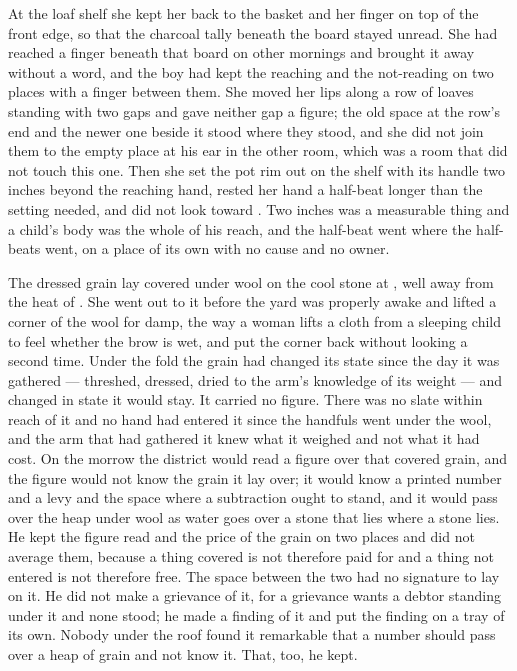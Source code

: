 At the loaf shelf she kept her back to the basket and her finger on top of the front edge, so that the charcoal tally beneath the board stayed unread. She had reached a finger beneath that board on other mornings and brought it away without a word, and the boy had kept the reaching and the not-reading on two places with a finger between them. She moved her lips along a row of loaves standing with two gaps and gave neither gap a figure; the old space at the row's end and the newer one beside it stood where they stood, and she did not join them to the empty place at his ear in the other room, which was a room that did not touch this one. Then she set the pot rim out on the shelf with its handle two inches beyond the reaching hand, rested her hand a half-beat longer than the setting needed, and did not look toward . Two inches was a measurable thing and a child's body was the whole of his reach, and the half-beat went where the half-beats went, on a place of its own with no cause and no owner.

\scenebreak

The dressed grain lay covered under wool on the cool stone at , well away from the heat of . She went out to it before the yard was properly awake and lifted a corner of the wool for damp, the way a woman lifts a cloth from a sleeping child to feel whether the brow is wet, and put the corner back without looking a second time. Under the fold the grain had changed its state since the day it was gathered --- threshed, dressed, dried to the arm's knowledge of its weight --- and changed in state it would stay. It carried no figure. There was no slate within reach of it and no hand had entered it since the handfuls went under the wool, and the arm that had gathered it knew what it weighed and not what it had cost. On the morrow the district would read a figure over that covered grain, and the figure would not know the grain it lay over; it would know a printed number and a levy and the space where a subtraction ought to stand, and it would pass over the heap under wool as water goes over a stone that lies where a stone lies. He kept the figure read and the price of the grain on two places and did not average them, because a thing covered is not therefore paid for and a thing not entered is not therefore free. The space between the two had no signature to lay on it. He did not make a grievance of it, for a grievance wants a debtor standing under it and none stood; he made a finding of it and put the finding on a tray of its own. Nobody under the roof found it remarkable that a number should pass over a heap of grain and not know it. That, too, he kept.


